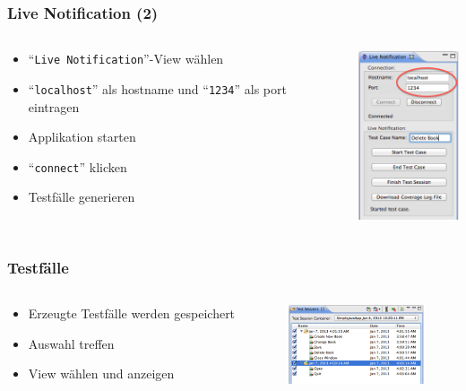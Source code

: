 \documentclass{beamer}
\begin{document}
  \begin{frame}\frametitle{Live Notification (2)}
    \begin{columns}
      \begin{column}{5cm}
        \begin{itemize}
          \item ``\texttt{Live Notification}''-View wählen
          \item ``\texttt{localhost}'' als hostname und ``\texttt{1234}'' als port eintragen
          \item Applikation starten
          \item ``\texttt{connect}'' klicken
          \item Testfälle generieren
        \end{itemize}
        \vspace{1cm}
      \end{column}
      \begin{column}{5cm}
        \begin{overprint}
          \includegraphics[height=50mm]{pictures/demo_eclipse/01_live_notification.png}
        \end{overprint}
      \end{column}
    \end{columns}
  \end{frame}

  \begin{frame}\frametitle{Testfälle}
    \begin{columns}
      \begin{column}{5cm}
        \begin{itemize}
          \item Erzeugte Testfälle werden gespeichert
          \item Auswahl treffen
          \item View wählen und anzeigen
        \end{itemize}
        \vspace{1cm}
      \end{column}
      \begin{column}{5cm}
        \begin{overprint}
          \includegraphics[width=4cm]{pictures/demo_eclipse/02_test_cases.png}
        \end{overprint}
      \end{column}
    \end{columns}
  \end{frame}
\end{document}
